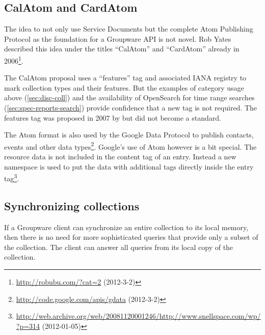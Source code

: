 \documentclass[11pt,a4paper,headsepline,twoside]{scrartcl}		%
\newcommand{\citeurl}[2]{\url{#1} (#2)}
\begin{document}

\subsection{CalAtom and CardAtom}
\label{sec:atom-publ-prot}

The idea to not only use Service Documents but the complete Atom Publishing
Protocol as the foundation for a Groupware API is not novel. Rob Yates described
this idea under the titles ``CalAtom'' and ``CardAtom'' already in
2006\footnote{\citeurl{http://robubu.com/?cat=2}{2012-3-2}}.

The CalAtom \cite{draft-yates-atompub-calatom-00.txt} proposal uses a
``features'' tag and associated IANA registry to mark collection types and their
features. But the examples of category usage above (\autoref{sec:disc-coll}) and
the availability of OpenSearch for time range searches
(\autoref{sec:spec-reports-search}) provide confidence that a new tag is not
required. The features tag was proposed in 2007 by
 \cite{draft-snell-atompub-feature} but did not become a standard.

The Atom format is also used by the Google Data Protocol to publish contacts,
events and other data
types\footnote{\citeurl{http://code.google.com/apis/gdata}{2012-3-2}}. Google's
use of Atom however is a bit special. The resource data is not included in the
content tag of an entry. Instead a new namespace is used to put the data with
additional tags directly inside the entry
tag\footnote{\citeurl{http://web.archive.org/web/20081120001246/http://www.snellspace.com/wp/?p=314}{2012-01-05}}.



\subsection{Synchronizing collections}
\label{sec:synchr-coll}

If a Groupware client can synchronize an entire collection to its local memory,
then there is no need for more sophisticated queries that provide only a subset
of the collection. The client can answer all queries from its local copy of the
collection.
\end{document}
